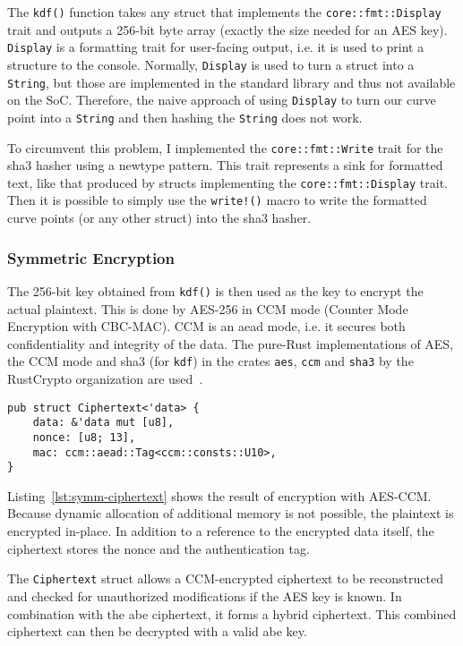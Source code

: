 The \verb+kdf()+ function takes any struct that implements the \texttt{core::fmt::Display} trait and outputs a 256-bit byte array (exactly the size needed for an AES key).
\texttt{Display} is a formatting trait for user-facing output, i.e. it is used to print a structure to the console.
Normally, \texttt{Display} is used to turn a struct into a \verb+String+, but those are implemented in the standard library and thus not available on the SoC.
Therefore, the naive approach of using \texttt{Display} to turn our curve point into a \texttt{String} and then hashing the \texttt{String} does not work.

To circumvent this problem, I implemented the \verb+core::fmt::Write+ trait for the \acrshort{sha3} hasher using a newtype pattern.
This trait represents a sink for formatted text, like that produced by structs implementing the \verb+core::fmt::Display+ trait.
Then it is possible to simply use the \verb+write!()+ macro to write the formatted curve points (or any other struct) into the \acrshort{sha3} hasher.

\subsubsection{Symmetric Encryption}

The 256-bit key obtained from \texttt{kdf()} is then used as the key to encrypt the actual plaintext.
This is done by AES-256 in CCM mode (Counter Mode Encryption with CBC-MAC).
CCM is an \acrshort{aead} mode, i.e. it secures both confidentiality and integrity of the data.
The pure-Rust implementations of AES, the CCM mode and \acrshort{sha3} (for \texttt{kdf}) in the crates \texttt{aes}, \texttt{ccm} and \texttt{sha3} by the RustCrypto organization are used~\cite{noauthor_rustcrypto_nodate}.

\begin{lstlisting}[caption={Symmetric Ciphertext struct},label={lst:symm-ciphertext}]
pub struct Ciphertext<'data> {
    data: &'data mut [u8],
    nonce: [u8; 13],
    mac: ccm::aead::Tag<ccm::consts::U10>,
}
\end{lstlisting}

Listing~\ref{lst:symm-ciphertext} shows the result of encryption with AES-CCM.
Because dynamic allocation of additional memory is not possible, the plaintext is encrypted in-place.
In addition to a reference to the encrypted data itself, the ciphertext stores the nonce and the authentication tag.

The \texttt{Ciphertext} struct allows a CCM-encrypted ciphertext to be reconstructed and checked for unauthorized modifications if the AES key is known.
In combination with the \acrshort{abe} ciphertext, it forms a hybrid ciphertext.
This combined ciphertext can then be decrypted with a valid \acrshort{abe} key.


